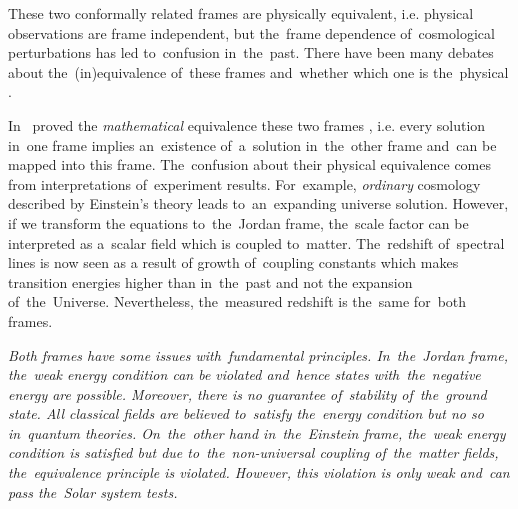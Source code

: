 These two conformally related frames are physically equivalent, i.e. physical observations are frame independent, but the~frame dependence of~cosmological perturbations has led to~confusion in~the~past. There have been many debates about the~(in)equivalence of~these frames \parencite{Postma:2014vaa} and~whether which one is the~physical \parencite{Faraoni:1999hp}.

In~\textcite{Magnano:1993bd} proved the \textit{mathematical} equivalence these two frames , i.e. every solution in~one frame implies an~existence of~a~solution in~the~other frame and~can be mapped into this frame. The~confusion about their physical equivalence comes from interpretations of~experiment results. For~example, \textit{ordinary} cosmology described by Einstein’s theory leads to~an~expanding universe solution. However, if we transform the equations to~the~Jordan frame, the~scale factor can be interpreted as a~scalar field which is coupled to~matter. The~redshift of~spectral lines is now seen as a result of growth of~coupling constants which makes transition energies higher than in~the~past and not the expansion of~the~Universe. Nevertheless, the~measured redshift is the~same for~both frames.

{\itshape
Both frames have some issues with~fundamental principles. In~the~Jordan frame, the~weak energy condition can be violated and~hence states with~the~negative energy are possible. Moreover, there is no guarantee of~stability of~the~ground state. All \textit{classical} fields are believed to~satisfy the~energy condition but no so in~quantum theories. On~the~other hand in~the~Einstein frame, the~weak energy condition is satisfied but due to~the~non-universal coupling of~the~matter fields, the~equivalence principle is violated. However, this violation is only weak and~can pass the~Solar system tests.
}
